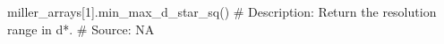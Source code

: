 miller_arrays[1].min_max_d_star_sq()
# Description:  Return the resolution range in d*.
# Source:  NA

